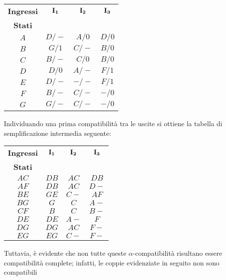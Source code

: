 \documentclass[a4paper]{extarticle}
\renewcommand\arraystretch{}
\begin{document}
\vspace{1em}
\noindent
\begin{table}[H]
\setlength{\tabcolsep}{4pt}
\renewcommand{\arraystretch}{1.2}
\centering
\begin{tabular}{c|c|c|c}
    \textbf{Ingressi} & $\bf{I_1}$ & $\bf{I_2}$ & $\bf{I_3}$\\
    \textbf{Stati}    &            &            &\\
    \hline
    $A$ & $D/-$ & $A/0$ & $D/0$\\
    $B$ & $G/1$ & $C/-$ & $B/0$\\
    $C$ & $B/-$ & $C/0$ & $B/0$\\
    $D$ & $D/0$ & $A/-$ & $F/1$\\
    $E$ & $D/-$ & $-/-$ & $F/1$\\
    $F$ & $B/-$ & $C/-$ & $-/0$\\
    $G$ & $G/-$ & $C/-$ & $-/0$\\
\end{tabular}
\end{table}

\vspace{2em}
\noindent
Individuando una prima compatibilità tra le uscite si ottiene la tabella di semplificazione intermedia seguente:

\vspace{1em}
\noindent
\begin{table}[H]
\setlength{\tabcolsep}{4pt}
\renewcommand{\arraystretch}{1.2}
\centering
\begin{tabular}{c|c|c|c}
    \textbf{Ingressi} & $\bf{I_1}$ & $\bf{I_2}$ & $\bf{I_3}$\\
    \textbf{Stati}    &            &            &\\
    \hline
    $AC$ & $DB$ & $AC$ & $DB$\\
    $AF$ & $DB$ & $AC$ & $D-$\\
    $BE$ & $GE$ & $C-$ & $AF$\\
    $BG$ & $G$  & $C$  & $A-$\\
    $CF$ & $B$  & $C$  & $B-$\\
    $DE$ & $DE$ & $A-$ & $F$\\
    $DG$ & $DG$ & $AC$ & $F-$\\
    $EG$ & $EG$ & $C-$ & $F-$\\
\end{tabular}
\end{table}

\vspace{1em}
\noindent
Tuttavia, è evidente che non tutte queste $\alpha$-compatibilità risultano essere compatibilità complete; infatti, le coppie evidenziate in seguito non sono compatibili
\end{document}
